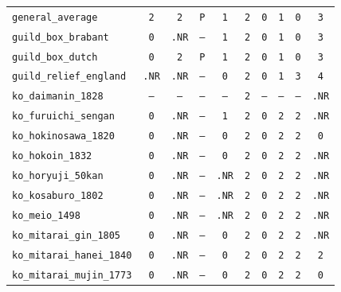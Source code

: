 \documentclass[11pt,a4paper]{article}
\begin{document}
\begin{table}[htbp]
\begin{tabular}{lccccccccc}
\texttt{general\_average} & \texttt{2} & \texttt{2} & \texttt{P} & \texttt{1} & \texttt{2} & \texttt{0} & \texttt{1} & \texttt{0} & \texttt{3} \\
\texttt{guild\_box\_brabant} & \texttt{0} & \texttt{.NR} & \texttt{--} & \texttt{1} & \texttt{2} & \texttt{0} & \texttt{1} & \texttt{0} & \texttt{3} \\
\texttt{guild\_box\_dutch} & \texttt{0} & \texttt{2} & \texttt{P} & \texttt{1} & \texttt{2} & \texttt{0} & \texttt{1} & \texttt{0} & \texttt{3} \\
\texttt{guild\_relief\_england} & \texttt{.NR} & \texttt{.NR} & \texttt{--} & \texttt{0} & \texttt{2} & \texttt{0} & \texttt{1} & \texttt{3} & \texttt{4} \\
\texttt{ko\_daimanin\_1828} & \texttt{--} & \texttt{--} & \texttt{--} & \texttt{--} & \texttt{2} & \texttt{--} & \texttt{--} & \texttt{--} & \texttt{.NR} \\
\texttt{ko\_furuichi\_sengan} & \texttt{0} & \texttt{.NR} & \texttt{--} & \texttt{1} & \texttt{2} & \texttt{0} & \texttt{2} & \texttt{2} & \texttt{.NR} \\
\texttt{ko\_hokinosawa\_1820} & \texttt{0} & \texttt{.NR} & \texttt{--} & \texttt{0} & \texttt{2} & \texttt{0} & \texttt{2} & \texttt{2} & \texttt{0} \\
\texttt{ko\_hokoin\_1832} & \texttt{0} & \texttt{.NR} & \texttt{--} & \texttt{0} & \texttt{2} & \texttt{0} & \texttt{2} & \texttt{2} & \texttt{.NR} \\
\texttt{ko\_horyuji\_50kan} & \texttt{0} & \texttt{.NR} & \texttt{--} & \texttt{.NR} & \texttt{2} & \texttt{0} & \texttt{2} & \texttt{2} & \texttt{.NR} \\
\texttt{ko\_kosaburo\_1802} & \texttt{0} & \texttt{.NR} & \texttt{--} & \texttt{.NR} & \texttt{2} & \texttt{0} & \texttt{2} & \texttt{2} & \texttt{.NR} \\
\texttt{ko\_meio\_1498} & \texttt{0} & \texttt{.NR} & \texttt{--} & \texttt{.NR} & \texttt{2} & \texttt{0} & \texttt{2} & \texttt{2} & \texttt{.NR} \\
\texttt{ko\_mitarai\_gin\_1805} & \texttt{0} & \texttt{.NR} & \texttt{--} & \texttt{0} & \texttt{2} & \texttt{0} & \texttt{2} & \texttt{2} & \texttt{.NR} \\
\texttt{ko\_mitarai\_hanei\_1840} & \texttt{0} & \texttt{.NR} & \texttt{--} & \texttt{0} & \texttt{2} & \texttt{0} & \texttt{2} & \texttt{2} & \texttt{2} \\
\texttt{ko\_mitarai\_mujin\_1773} & \texttt{0} & \texttt{.NR} & \texttt{--} & \texttt{0} & \texttt{2} & \texttt{0} & \texttt{2} & \texttt{2} & \texttt{0} \\

\end{tabular}
\end{table}
\end{document}
